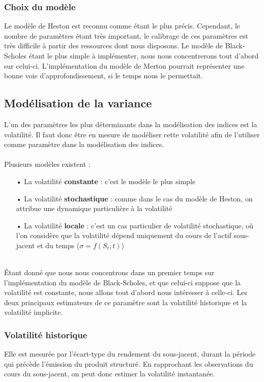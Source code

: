 \documentclass[french,12pt,a4paper]{article}
\begin{document}
\subsubsection{Choix du modèle}
Le modèle de Heston est reconnu comme étant le plus précis. Cependant, le nombre de paramètres étant très important, le calibrage de ces paramètres est très difficile à partir des ressources dont nous disposons. Le modèle de Black-Scholes étant le plus simple à implémenter, nous nous concentrerons tout d'abord sur celui-ci. L'implémentation du modèle de Merton pourrait représenter une bonne voie d'approfondissement, si le temps nous le permettait. \\


\subsection{Modélisation de la variance}
L'un des paramètres les plus déterminants dans la modélisation des indices est la volatilité. Il faut donc être en mesure de modéliser cette volatilité afin de l'utiliser comme paramètre dans la modélisation des indices.\\ \\
Plusieurs modèles existent :
\begin{itemize}
\item[•] La volatilité \textbf{constante} : c'est le modèle le plus simple
\item[•] La volatilité \textbf{stochastique} : comme dans le cas du modèle de Heston, on attribue une dynamique particulière à la volatilité
\item[•] La volatilité \textbf{locale} : c'est un cas particulier de volatilité stochastique, où l'on considère que la volatilité dépend uniquement du cours de l'actif sous-jacent et du temps ($\sigma = f(S_{t},t)$)
\end{itemize}
\\
Étant donné que nous nous concentrons dans un premier temps sur l'implémentation du modèle de Black-Scholes, et que celui-ci suppose que la volatilité est constante, nous allons tout d'abord nous intéresser à celle-ci.  Les deux principaux estimateurs de ce paramètre sont la volatilité historique et la volatilité implicite.

\subsubsection{Volatilité historique}
Elle est mesurée par l'écart-type du rendement du sous-jacent, durant la période qui précède l'émission du produit structuré. En rapprochant les observations du cours du sous-jacent, on peut donc estimer la volatilité instantanée.\\
\end{document}
